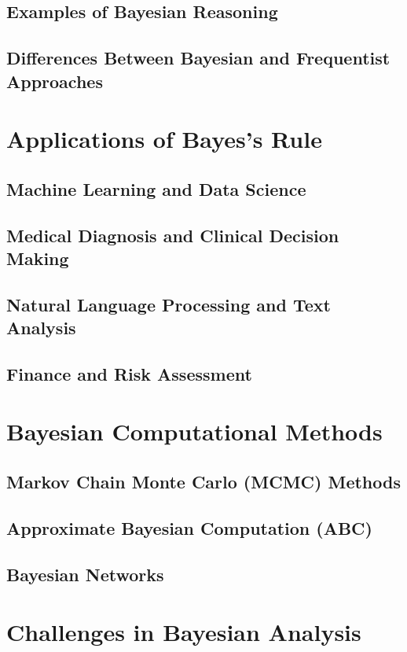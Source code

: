 \documentclass[12pt]{book} %
\begin{document}
\subsection{Examples of Bayesian Reasoning}
\subsection{Differences Between Bayesian and Frequentist Approaches}

\section{Applications of Bayes's Rule}
\subsection{Machine Learning and Data Science}
\subsection{Medical Diagnosis and Clinical Decision Making}
\subsection{Natural Language Processing and Text Analysis}
\subsection{Finance and Risk Assessment}

\section{Bayesian Computational Methods}
\subsection{Markov Chain Monte Carlo (MCMC) Methods}
\subsection{Approximate Bayesian Computation (ABC)}
\subsection{Bayesian Networks}

\section{Challenges in Bayesian Analysis}
\end{document}
